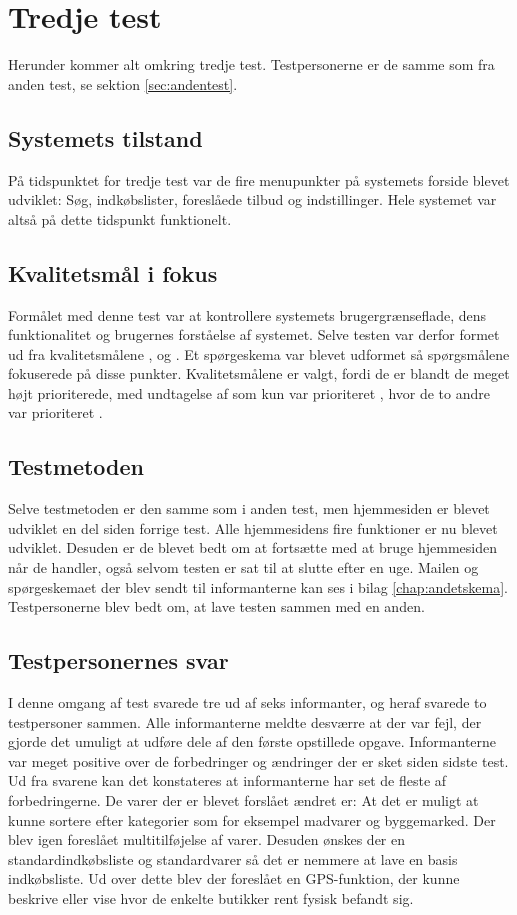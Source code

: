 \section{Tredje test}
Herunder kommer alt omkring tredje test. Testpersonerne er de samme som fra anden test, se sektion \ref{sec:andentest}.

\subsection{Systemets tilstand}
På tidspunktet for tredje test var de fire menupunkter på systemets forside blevet udviklet: Søg, indkøbslister, foreslåede tilbud og indstillinger. Hele systemet var altså på dette tidspunkt funktionelt.  

\subsection{Kvalitetsmål i fokus}
Formålet med denne test var at kontrollere systemets brugergrænseflade, dens funktionalitet og brugernes forståelse af systemet. Selve testen var derfor formet ud fra kvalitetsmålene ,  og . Et spørgeskema var blevet udformet så spørgsmålene fokuserede på disse punkter.
Kvalitetsmålene er valgt, fordi de er blandt de meget højt prioriterede, med undtagelse af  som kun var prioriteret , hvor de to andre var prioriteret . 

\subsection{Testmetoden}
Selve testmetoden er den samme som i anden test, men hjemmesiden er blevet udviklet en del siden forrige test. Alle hjemmesidens fire funktioner er nu blevet udviklet. Desuden er de blevet bedt om at fortsætte med at bruge hjemmesiden når de handler, også selvom testen er sat til at slutte efter en uge. Mailen og spørgeskemaet der blev sendt til informanterne kan ses i bilag \ref{chap:andetskema}. Testpersonerne blev bedt om, at lave testen sammen med en anden.

\subsection{Testpersonernes svar}
I denne omgang af test svarede tre ud af seks informanter, og heraf svarede to testpersoner sammen. Alle informanterne meldte desværre at der var fejl, der gjorde det umuligt at udføre dele af den første opstillede opgave. Informanterne var meget positive over de forbedringer og ændringer der er sket siden sidste test. Ud fra svarene kan det konstateres at informanterne har set de fleste af forbedringerne. De varer der er blevet forslået ændret er:
At det er muligt at kunne sortere efter kategorier som for eksempel madvarer og byggemarked. Der blev igen foreslået multitilføjelse af varer. Desuden ønskes der en standardindkøbsliste og standardvarer så det er nemmere at lave en basis indkøbsliste. Ud over dette blev der foreslået en GPS-funktion, der kunne beskrive eller vise hvor de enkelte butikker rent fysisk befandt sig.

